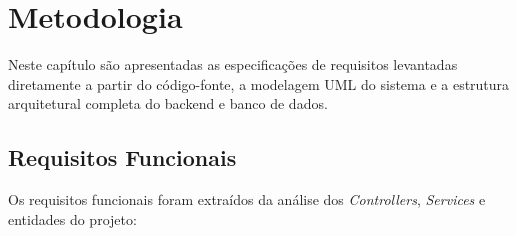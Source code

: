 \chapter{Metodologia}

Neste capítulo são apresentadas as especificações de requisitos levantadas diretamente a partir do código-fonte, a modelagem UML do sistema e a estrutura arquitetural completa do backend e banco de dados.

\section{Requisitos Funcionais}

Os requisitos funcionais foram extraídos da análise dos \textit{Controllers}, \textit{Services} e entidades do projeto:

